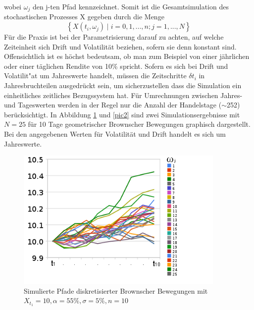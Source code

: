 \documentclass[12pt,a4paper,headsepline,bibliography=totoc,listof=totoc,headinclude=false,footinclude=false,BCOR5mm]{scrreprt} %
\begin{document}
wobei $\omega_j$ den j-ten Pfad kennzeichnet. Somit ist die Gesamtsimulation des stochastischen Prozesses X gegeben durch die Menge
  \begin{equation} \label{menge}
\left \{ X(t_{i},\omega_j) \mid i=0,1, ...,n; j=1,...,N \right \} 
\end{equation}
F\"ur die Praxis ist bei der Parametrisierung darauf zu achten, auf welche Zeiteinheit sich Drift und Volatilit\"at beziehen, sofern sie denn konstant sind. Offensichtlich ist es h\"ochst bedeutsam, ob man zum Beispiel von einer j\"ahrlichen oder einer t\"aglichen Rendite von 10\% spricht. Sofern es sich bei Drift und Volatilit"at um Jahreswerte handelt, m\"ussen die Zeitschritte $\delta t_i$ in Jahresbruchteilen ausgedr\"uckt sein, um sicherzustellen dass die Simulation ein einheitliches zeitliches Bezugssystem hat.
F\"ur  Umrechnungen zwischen Jahres- und Tageswerten werden in der Regel nur die Anzahl der Handelstage ($\sim$252) ber\"ucksichtigt. In Abbildung \ref{pic1} und \ref{pic2} sind zwei Simulationsergebnisse mit $N=25$ f\"ur 10 Tage  geometrischer Brownscher Bewegungen graphisch dargestellt. Bei den angegebenen Werten f\"ur Volatilit\"at und Drift handelt es sich um Jahreswerte.
\begin{figure}[h!]
    \centering
    \includegraphics[width=0.90\textwidth]{1}
\caption{Simulierte Pfade diskretisierter Brownscher Bewegungen mit \\ $X_{t_1}=10, \alpha=55\%, \sigma=5\%, n=10$}\label{pic1}
\end{figure}
\end{document}
